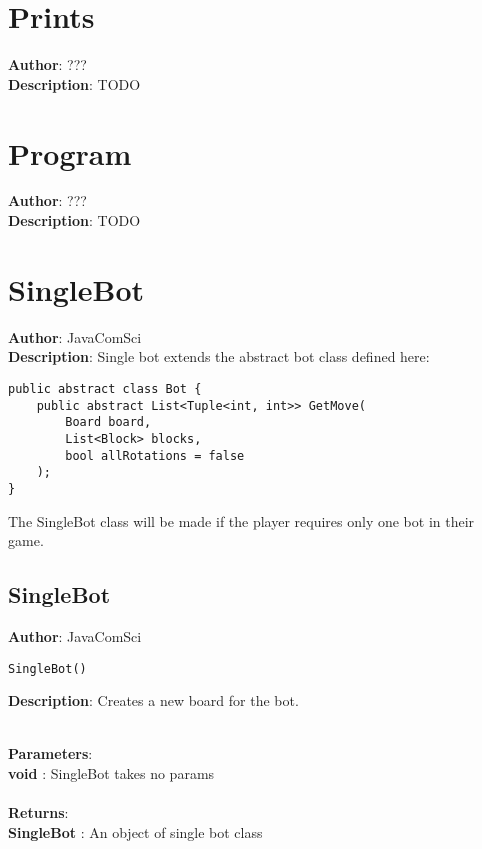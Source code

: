 \documentclass[12pt]{article}
\begin{document}
\section{Prints}
\textbf{Author}: ??? \\
\textbf{Description}: TODO \\



\section{Program}
\textbf{Author}: ??? \\
\textbf{Description}: TODO \\



\section{SingleBot}
\textbf{Author}: JavaComSci \\
\textbf{Description}: Single bot extends the abstract bot class defined here: 
\begin{verbatim}
public abstract class Bot {
    public abstract List<Tuple<int, int>> GetMove(
        Board board, 
        List<Block> blocks, 
        bool allRotations = false
    );
}
\end{verbatim}
 The SingleBot class will be made if the player requires only one bot in their game. \\



\subsection{SingleBot}
\textbf{Author}: JavaComSci 
\vspace*{1\baselineskip}
\begin{lstlisting}
SingleBot()
\end{lstlisting} 
\vspace*{1\baselineskip}
\textbf{Description}: Creates a new board for the bot. 


\textbf{\large{\\Parameters}}:\\
\textbf{void }: SingleBot takes no params\\\textbf{\large{\\Returns}}:\\\textbf{SingleBot }: An object of single bot class
\end{document}
